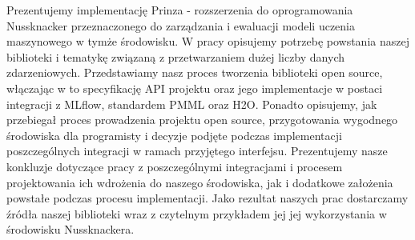 Prezentujemy implementację Prinza - rozszerzenia do oprogramowania Nussknacker przeznaczonego
do zarządzania i ewaluacji modeli uczenia maszynowego w tymże środowisku. W pracy opisujemy
potrzebę powstania naszej biblioteki i tematykę związaną z przetwarzaniem dużej liczby danych
zdarzeniowych. Przedstawiamy nasz proces tworzenia biblioteki open source, włączając w to
specyfikację API projektu oraz jego implementacje w postaci integracji z MLflow, standardem
PMML oraz H2O. Ponadto opisujemy, jak przebiegał proces prowadzenia projektu open source,
przygotowania wygodnego środowiska dla programisty i decyzje podjęte podczas implementacji
poszczególnych integracji w ramach przyjętego interfejsu. Prezentujemy nasze konkluzje
dotyczące pracy z poszczególnymi integracjami i procesem projektowania ich wdrożenia do
naszego środowiska, jak i dodatkowe założenia powstałe podczas procesu implementacji.
Jako rezultat naszych prac dostarczamy źródła naszej biblioteki wraz z czytelnym przykładem
jej jej wykorzystania w środowisku Nussknackera.

